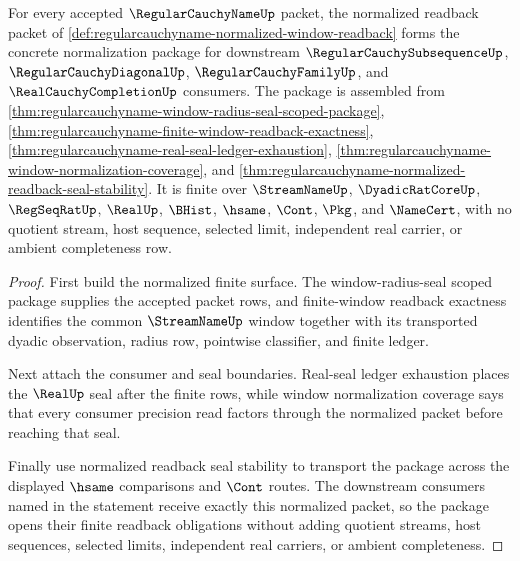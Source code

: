 \begin{theorem}
\label{thm:regularcauchyname-root-unblock-normalization-package}
For every accepted $\RegularCauchyNameUp$ packet, the normalized readback packet of \autoref{def:regularcauchyname-normalized-window-readback} forms the concrete normalization package for downstream $\RegularCauchySubsequenceUp$, $\RegularCauchyDiagonalUp$, $\RegularCauchyFamilyUp$, and $\RealCauchyCompletionUp$ consumers. The package is assembled from \autoref{thm:regularcauchyname-window-radius-seal-scoped-package}, \autoref{thm:regularcauchyname-finite-window-readback-exactness}, \autoref{thm:regularcauchyname-real-seal-ledger-exhaustion}, \autoref{thm:regularcauchyname-window-normalization-coverage}, and \autoref{thm:regularcauchyname-normalized-readback-seal-stability}. It is finite over $\StreamNameUp$, $\DyadicRatCoreUp$, $\RegSeqRatUp$, $\RealUp$, $\BHist$, $\hsame$, $\Cont$, $\Pkg$, and $\NameCert$, with no quotient stream, host sequence, selected limit, independent real carrier, or ambient completeness row.
\end{theorem}
\begin{proof}
First build the normalized finite surface. The window-radius-seal scoped package supplies the accepted packet rows, and finite-window readback exactness identifies the common $\StreamNameUp$ window together with its transported dyadic observation, radius row, pointwise classifier, and finite ledger.

Next attach the consumer and seal boundaries. Real-seal ledger exhaustion places the $\RealUp$ seal after the finite rows, while window normalization coverage says that every consumer precision read factors through the normalized packet before reaching that seal.

Finally use normalized readback seal stability to transport the package across the displayed $\hsame$ comparisons and $\Cont$ routes. The downstream consumers named in the statement receive exactly this normalized packet, so the package opens their finite readback obligations without adding quotient streams, host sequences, selected limits, independent real carriers, or ambient completeness.
\end{proof}

